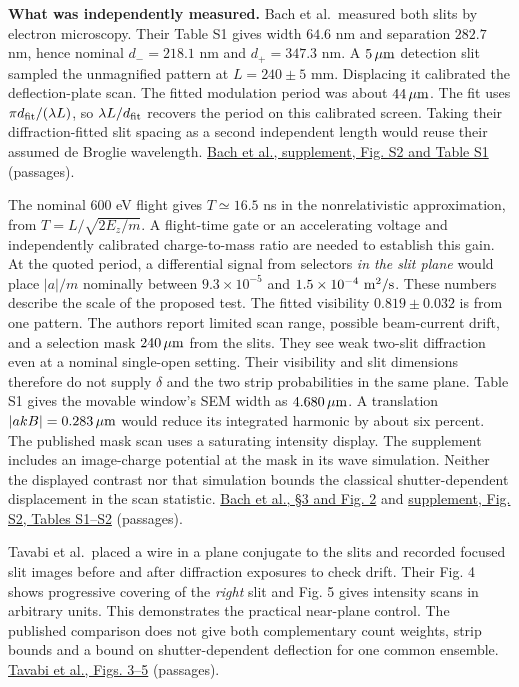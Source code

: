 \documentclass[11pt,a4paper]{article}
\begin{document}
\textbf{What was independently measured.} Bach et al.~measured both
slits by electron microscopy. Their Table S1 gives width \(64.6\) nm and
separation \(282.7\) nm, hence nominal \(d_-=218.1\) nm and
\(d_+=347.3\) nm. A \(5\,\mu{\rm m}\) detection slit sampled the
unmagnified pattern at \(L=240\pm5\) mm. Displacing it calibrated the
deflection-plate scan. The fitted modulation period was about
\(44\,\mu{\rm m}\). The fit uses \(\pi d_{\rm fit}/(\lambda L)\), so
\(\lambda L/d_{\rm fit}\) recovers the period on this calibrated screen.
Taking their diffraction-fitted slit spacing as a second independent
length would reuse their assumed de Broglie wavelength.
\href{https://www.tezu.ernet.in/rctp2015/2\%20supp_double_slit.pdf}{Bach
et al., supplement, Fig. S2 and Table S1} (passages).

The nominal 600 eV flight gives \(T\simeq16.5\) ns in the
nonrelativistic approximation, from \(T=L/\sqrt{2E_z/m}\). A flight-time
gate or an accelerating voltage and independently calibrated
charge-to-mass ratio are needed to establish this gain. At the quoted
period, a differential signal from selectors \emph{in the slit plane}
would place \(|a|/m\) nominally between \(9.3\times10^{-5}\) and
\(1.5\times10^{-4}\ {\rm m^2/s}\). These numbers describe the scale of
the proposed test. The fitted visibility \(0.819\pm0.032\) is from one
pattern. The authors report limited scan range, possible beam-current
drift, and a selection mask \(240\,\mu{\rm m}\) from the slits. They see
weak two-slit diffraction even at a nominal single-open setting. Their
visibility and slit dimensions therefore do not supply \(\delta\) and
the two strip probabilities in the same plane. Table S1 gives the
movable window's SEM width as \(4.680\,\mu{\rm m}\). A translation
\(|akB|=0.283\,\mu{\rm m}\) would reduce its integrated harmonic by
about six percent. The published mask scan uses a saturating intensity
display. The supplement includes an image-charge potential at the mask
in its wave simulation. Neither the displayed contrast nor that
simulation bounds the classical shutter-dependent displacement in the
scan statistic.
\href{https://doi.org/10.1088/1367-2630/15/3/033018}{Bach et al., §3 and
Fig. 2} and
\href{https://www.tezu.ernet.in/rctp2015/2\%20supp_double_slit.pdf}{supplement,
Fig. S2, Tables S1--S2} (passages).

Tavabi et al.~placed a wire in a plane conjugate to the slits and
recorded focused slit images before and after diffraction exposures to
check drift. Their Fig. 4 shows progressive covering of the \emph{right}
slit and Fig. 5 gives intensity scans in arbitrary units. This
demonstrates the practical near-plane control. The published comparison
does not give both complementary count weights, strip bounds and a bound
on shutter-dependent deflection for one common ensemble.
\href{https://doi.org/10.1038/s41598-019-43323-2}{Tavabi et al., Figs.
3--5} (passages).
\end{document}
